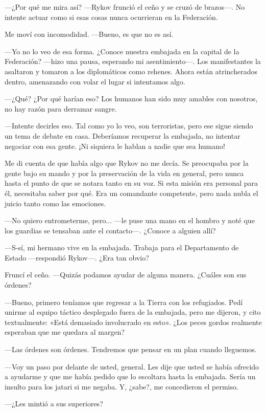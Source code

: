  —¿Por qué me mira así? —Rykov frunció el ceño y se cruzó de brazos—. No intente actuar como si esas cosas nunca ocurrieran en la Federación.

Me moví con incomodidad. —Bueno, es que no es así.

—Yo no lo veo de esa forma. ¿Conoce nuestra embajada en la capital de la Federación? —hizo una pausa, esperando mi asentimiento—. Los manifestantes la asaltaron y tomaron a los diplomáticos como rehenes. Ahora están atrincherados dentro, amenazando con volar el lugar si intentamos algo.

 —¿Qué? ¿Por qué harían eso? Los humanos han sido muy amables con nosotros, no hay razón para derramar sangre.

—Intente decirles eso. Tal como yo lo veo, son terroristas, pero ese sigue siendo un tema de debate en casa. Deberíamos recuperar la embajada, no intentar negociar con esa gente. ¡Ni siquiera le hablan a nadie que sea humano!

Me di cuenta de que había algo que Rykov no me decía. Se preocupaba por la gente bajo su mando y por la preservación de la vida en general, pero nunca hasta el punto de que se notara tanto en su voz. Si esta misión era personal para él, necesitaba saber por qué. Era un comandante competente, pero nada nubla el juicio tanto como las emociones.

—No quiero entrometerme, pero... —le puse una mano en el hombro y noté que los guardias se tensaban ante el contacto—. ¿Conoce a alguien allí?

 —S-sí, mi hermano vive en la embajada. Trabaja para el Departamento de Estado —respondió Rykov—. ¿Era tan obvio?

Fruncí el ceño. —Quizás podamos ayudar de alguna manera. ¿Cuáles son sus órdenes?

—Bueno, primero teníamos que regresar a la Tierra con los refugiados. Pedí unirme al equipo táctico desplegado fuera de la embajada, pero me dijeron, y cito textualmente: «Está demasiado involucrado en esto». ¿Los peces gordos realmente esperaban que me quedara al margen?

—Las órdenes son órdenes. Tendremos que pensar en un plan cuando lleguemos.

—Voy un paso por delante de usted, general. Les dije que usted se había ofrecido a ayudarme y que me había pedido que lo escoltara hasta la embajada. Sería un insulto para los jatari si me negaba. Y, ¿sabe?, me concedieron el permiso.

 —¿Les mintió a sus superiores?

